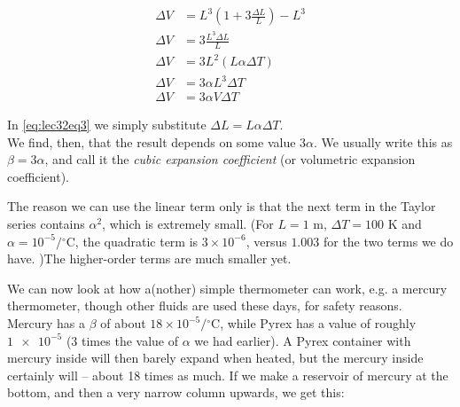 \begin{align}
\Delta V &= L^3 (1 + 3 \frac{\Delta L}{L})     - L^3\\
\Delta V &= 3 \frac{L^3 \Delta L}{L}\\
\Delta V &= 3 L^2 (L \alpha \Delta T) \label{eq:lec32eq3}\\
\Delta V &= 3 \alpha L^3  \Delta T\\
\Delta V &= 3 \alpha V  \Delta T
\end{align}

In \eqref{eq:lec32eq3} we simply substitute $\Delta L = L \alpha \Delta T$.\\
We find, then, that the result depends on some value $3 \alpha$. We usually write this as $\beta = 3 \alpha$, and call it the \emph{cubic expansion coefficient} (or volumetric expansion coefficient).

The reason we can use the linear term only is that the next term in the Taylor series contains $\alpha^2$, which is extremely small. (For $L = 1$ m, $\Delta T = 100$ K and $\alpha = 10^{-5}/{}^\circ$C, the quadratic term is $3 \times 10^{-6}$, versus $1.003$ for the two terms we do have. )The higher-order terms are much smaller yet.

We can now look at how a(nother) simple thermometer can work, e.g. a mercury thermometer, though other fluids are used these days, for safety reasons.\\
Mercury has a $\beta$ of about $18 \times 10^{-5}/{}^\circ$C, while Pyrex has a value of roughly $\num{1e-5}$ (3 times the value of $\alpha$ we had earlier). A Pyrex container with mercury inside will then barely expand when heated, but the mercury inside certainly will -- about 18 times as much. If we make a reservoir of mercury at the bottom, and then a very narrow column upwards, we get this:

